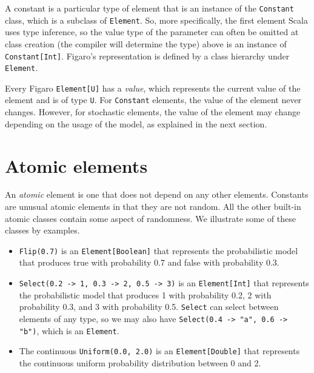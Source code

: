 A constant is a particular type of element that is an instance of the \texttt{Constant}
class, which is a subclass of \texttt{Element}. So, more specifically, the first element Scala uses type inference, so the value type of the parameter can often be omitted at class creation (the compiler will determine the type) above is an instance of \texttt{Constant[Int]}. Figaro's representation is defined by a class hierarchy under
\texttt{Element}.

Every Figaro \texttt{Element[U]} has a \emph{value}, which represents the current value of the element and is of type \texttt{U}. For \texttt{Constant} elements, the value of the element never changes. However, for stochastic elements, the value of the element may change depending on the usage of the model, as explained in the next section.

\section{Atomic elements}

An \emph{atomic} element is one that does not depend on any other elements. Constants are unusual atomic elements in that they are not random. All the other built-in atomic classes contain some aspect of randomness. We illustrate some of these classes by examples.

\begin{itemize}
\item \texttt{Flip(0.7)} is an \texttt{Element[Boolean]} that represents the probabilistic model that produces true with probability 0.7 and false with probability 0.3.
\item \texttt{Select(0.2 -> 1, 0.3 -> 2, 0.5 -> 3)} is an \texttt{Element[Int]} that represents the probabilistic model that produces 1 with probability 0.2, 2 with probability 0.3, and 3 with probability 0.5. \texttt{Select} can select between elements of any type, so we may also have
\texttt{Select(0.4 -> "a", 0.6 -> "b")}, which is an \texttt{Element\-[String]}.
\item The continuous \texttt{Uniform(0.0, 2.0)} is an \texttt{Element[Double]} that represents the continuous uniform probability distribution between 0 and 2.
\end{itemize}


